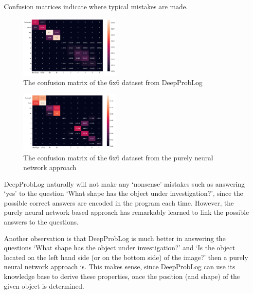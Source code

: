 \documentclass[english]{sobraep}
\begin{document}
Confusion matrices indicate where typical mistakes are made.

\begin{figure}[htp]
    \begin{center}
    \includegraphics[width=0.45\textwidth]{confusion_matrix_6x6_deepproblog.png} 
    \captionsetup{justification=centering}
    \caption{The confusion matrix of the 6x6 dataset from DeepProbLog}
    \label{fig:confusion_matrix_6x6_deepproblog}
    \end{center}
\end{figure}

\begin{figure}[htp]
    \begin{center}
    \includegraphics[width=0.45\textwidth]{confusion_matrix_6x6_pure_NN.png} 
    \captionsetup{justification=centering}
    \caption{The confusion matrix of the 6x6 dataset from the purely neural network approach}
    \label{fig:confusion_matrix_6x6_pure_nn}
    \end{center}
\end{figure}

DeepProbLog naturally will not make any `nonsense' mistakes such as answering `yes' to the question `What shape has the object under investigation?', since the possible correct answers are encoded in the program each time. However, the purely neural network based approach has remarkably learned to link the possible answers to the questions.

Another observation is that DeepProbLog is much better in answering the questions `What shape has the object under investigation?' and `Is the object located on the left hand side (or on the bottom side) of the image?' then a purely neural network approach is. This makes sense, since DeepProbLog can use its knowledge base to derive these properties, once the position (and shape) of the given object is determined.
\end{document}
